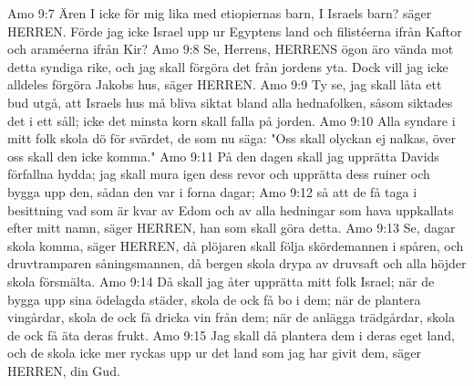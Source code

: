 Amo 9:7  Ären I icke för mig lika med etiopiernas barn, I Israels barn? säger HERREN. Förde jag icke Israel upp ur Egyptens land och filistéerna ifrån Kaftor och araméerna ifrån Kir?
Amo 9:8  Se, Herrens, HERRENS ögon äro vända mot detta syndiga rike, och jag skall förgöra det från jordens yta. Dock vill jag icke alldeles förgöra Jakobs hus, säger HERREN.
Amo 9:9  Ty se, jag skall låta ett bud utgå, att Israels hus må bliva siktat bland alla hednafolken, såsom siktades det i ett såll; icke det minsta korn skall falla på jorden.
Amo 9:10  Alla syndare i mitt folk skola dö för svärdet, de som nu säga: "Oss skall olyckan ej nalkas, över oss skall den icke komma."
Amo 9:11  På den dagen skall jag upprätta Davids förfallna hydda; jag skall mura igen dess revor och upprätta dess ruiner och bygga upp den, sådan den var i forna dagar;
Amo 9:12  så att de få taga i besittning vad som är kvar av Edom och av alla hedningar som hava uppkallats efter mitt namn, säger HERREN, han som skall göra detta.
Amo 9:13  Se, dagar skola komma, säger HERREN, då plöjaren skall följa skördemannen i spåren, och druvtramparen såningsmannen, då bergen skola drypa av druvsaft och alla höjder skola försmälta.
Amo 9:14  Då skall jag åter upprätta mitt folk Israel; när de bygga upp sina ödelagda städer, skola de ock få bo i dem; när de plantera vingårdar, skola de ock få dricka vin från dem; när de anlägga trädgårdar, skola de ock få äta deras frukt.
Amo 9:15  Jag skall då plantera dem i deras eget land, och de skola icke mer ryckas upp ur det land som jag har givit dem, säger HERREN, din Gud.


